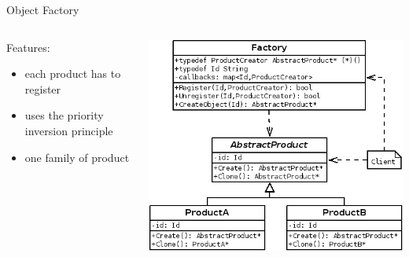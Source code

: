 \documentclass{beamer}
\begin{document}
\begin{frame}{Object Factory}
  \begin{columns}
    \begin{column}{.47\textwidth}
      \begin{block}{Features:}
        \begin{itemize}
          \item each product has to register
          \item uses the priority inversion principle
          \item one family of product
        \end{itemize}
      \end{block}
    \end{column}
    \begin{column}{.47\textwidth}
      \includegraphics[width=\textwidth]{ObjFact.png}
    \end{column}
  \end{columns}
\end{frame}
\end{document}
